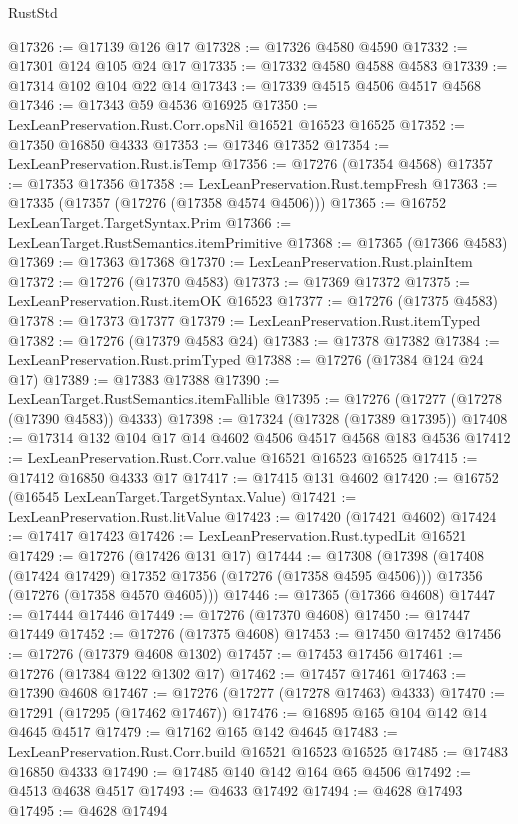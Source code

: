 \begin{lexlean}{RustStd}
\begin{coremodule}
@17326 := @17139 @126 @17
@17328 := @17326 @4580 @4590
@17332 := @17301 @124 @105 @24 @17
@17335 := @17332 @4580 @4588 @4583
@17339 := @17314 @102 @104 @22 @14
@17343 := @17339 @4515 @4506 @4517 @4568
@17346 := @17343 @59 @4536 @16925
@17350 := LexLeanPreservation.Rust.Corr.opsNil @16521 @16523 @16525
@17352 := @17350 @16850 @4333
@17353 := @17346 @17352
@17354 := LexLeanPreservation.Rust.isTemp
@17356 := @17276 (@17354 @4568)
@17357 := @17353 @17356
@17358 := LexLeanPreservation.Rust.tempFresh
@17363 := @17335 (@17357 (@17276 (@17358 @4574 @4506)))
@17365 := @16752 LexLeanTarget.TargetSyntax.Prim
@17366 := LexLeanTarget.RustSemantics.itemPrimitive
@17368 := @17365 (@17366 @4583)
@17369 := @17363 @17368
@17370 := LexLeanPreservation.Rust.plainItem
@17372 := @17276 (@17370 @4583)
@17373 := @17369 @17372
@17375 := LexLeanPreservation.Rust.itemOK @16523
@17377 := @17276 (@17375 @4583)
@17378 := @17373 @17377
@17379 := LexLeanPreservation.Rust.itemTyped
@17382 := @17276 (@17379 @4583 @24)
@17383 := @17378 @17382
@17384 := LexLeanPreservation.Rust.primTyped
@17388 := @17276 (@17384 @124 @24 @17)
@17389 := @17383 @17388
@17390 := LexLeanTarget.RustSemantics.itemFallible
@17395 := @17276 (@17277 (@17278 (@17390 @4583)) @4333)
@17398 := @17324 (@17328 (@17389 @17395))
@17408 := @17314 @132 @104 @17 @14 @4602 @4506 @4517 @4568 @183 @4536
@17412 := LexLeanPreservation.Rust.Corr.value @16521 @16523 @16525
@17415 := @17412 @16850 @4333 @17
@17417 := @17415 @131 @4602
@17420 := @16752 (@16545 LexLeanTarget.TargetSyntax.Value)
@17421 := LexLeanPreservation.Rust.litValue
@17423 := @17420 (@17421 @4602)
@17424 := @17417 @17423
@17426 := LexLeanPreservation.Rust.typedLit @16521
@17429 := @17276 (@17426 @131 @17)
@17444 := @17308
    (@17398
      (@17408 (@17424 @17429) @17352 @17356 (@17276 (@17358 @4595 @4506)))
      @17356
      (@17276 (@17358 @4570 @4605)))
@17446 := @17365 (@17366 @4608)
@17447 := @17444 @17446
@17449 := @17276 (@17370 @4608)
@17450 := @17447 @17449
@17452 := @17276 (@17375 @4608)
@17453 := @17450 @17452
@17456 := @17276 (@17379 @4608 @1302)
@17457 := @17453 @17456
@17461 := @17276 (@17384 @122 @1302 @17)
@17462 := @17457 @17461
@17463 := @17390 @4608
@17467 := @17276 (@17277 (@17278 @17463) @4333)
@17470 := @17291 (@17295 (@17462 @17467))
@17476 := @16895 @165 @104 @142 @14 @4645 @4517
@17479 := @17162 @165 @142 @4645
@17483 := LexLeanPreservation.Rust.Corr.build @16521 @16523 @16525
@17485 := @17483 @16850 @4333
@17490 := @17485 @140 @142 @164 @65 @4506
@17492 := @4513 @4638 @4517
@17493 := @4633 @17492
@17494 := @4628 @17493
@17495 := @4628 @17494

\end{coremodule}
\end{lexlean}
